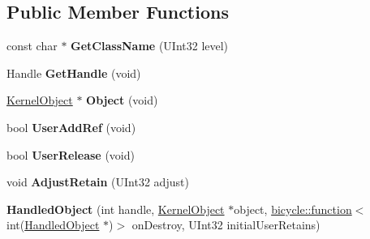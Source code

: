 \subsection*{Public Member Functions}
\begin{DoxyCompactItemize}
\item 
\mbox{\label{class_kernel_object___internal_1_1_handled_object_abb1f87dd4f558cc863c0190781e7a833}} 
const char $\ast$ {\bfseries Get\+Class\+Name} (U\+Int32 level)
\item 
\mbox{\label{class_kernel_object___internal_1_1_handled_object_a81bf2b155b8c8c37d3957fbc2ce652d8}} 
Handle {\bfseries Get\+Handle} (void)
\item 
\mbox{\label{class_kernel_object___internal_1_1_handled_object_a6cbd10ce63492db268584cf2f4ee5550}} 
\hyperlink{class_kernel_object}{Kernel\+Object} $\ast$ {\bfseries Object} (void)
\item 
\mbox{\label{class_kernel_object___internal_1_1_handled_object_a9b28bd635ae568d8ea706c7a1c832dc5}} 
bool {\bfseries User\+Add\+Ref} (void)
\item 
\mbox{\label{class_kernel_object___internal_1_1_handled_object_a6187d669b52913f92050d603854a5656}} 
bool {\bfseries User\+Release} (void)
\item 
\mbox{\label{class_kernel_object___internal_1_1_handled_object_afb6b19db628f94bd94cc2db3c744c93d}} 
void {\bfseries Adjust\+Retain} (U\+Int32 adjust)
\item 
\mbox{\label{class_kernel_object___internal_1_1_handled_object_a8595534a454e88e9fd645ebb8f9ebef1}} 
{\bfseries Handled\+Object} (int handle, \hyperlink{class_kernel_object}{Kernel\+Object} $\ast$object, \hyperlink{classbicycle_1_1function}{bicycle\+::function}$<$ int(\hyperlink{class_kernel_object___internal_1_1_handled_object}{Handled\+Object} $\ast$)$>$ on\+Destroy, U\+Int32 initial\+User\+Retains)
\end{DoxyCompactItemize}
